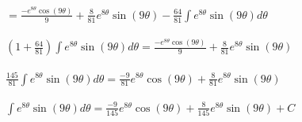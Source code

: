 \documentclass{article}
\begin{document}
{$ = \frac{-e^{8\theta}\cos(9\theta)}{9} + \frac{8}{81}e^{8\theta}\sin(9\theta) - \frac{64}{81}\int{e^{8\theta}\sin(9\theta)} d\theta $\\\\

$ (1+\frac{64}{81})\int{e^{8\theta}\sin(9\theta)} d\theta = \frac{-e^{8\theta}\cos(9\theta)}{9} + \frac{8}{81}e^{8\theta}\sin(9\theta) $\\\\

$ \frac{145}{81}\int{e^{8\theta}\sin(9\theta)} d\theta = \frac{-9}{81}e^{8\theta}\cos(9\theta) + \frac{8}{81}e^{8\theta}\sin(9\theta) $\\\\

$ \int{e^{8\theta}\sin(9\theta)} d\theta = \frac{-9}{145}e^{8\theta}\cos(9\theta) + \frac{8}{145}e^{8\theta}\sin(9\theta) + C $\\

}
\end{document}
